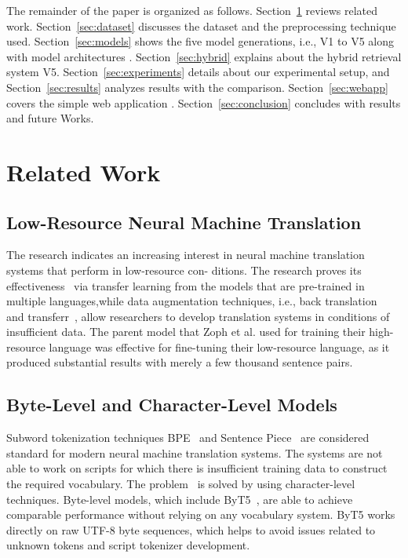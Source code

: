 \documentclass[conference]{IEEEtran}
\begin{document}
The remainder of the paper is organized as follows. Section~\ref{sec:related} reviews related work. Section~\ref{sec:dataset} discusses the dataset and the preprocessing technique used. Section~\ref{sec:models} shows the five model generations, i.e., V1 to V5 along with model architectures . Section~\ref{sec:hybrid} explains about the hybrid retrieval system V5. Section~\ref{sec:experiments} details about our experimental setup, and Section~\ref{sec:results} analyzes results with the comparison. Section~\ref{sec:webapp} covers the simple web application . Section~\ref{sec:conclusion} concludes with results and future Works.

\section{Related Work}\label{sec:related}

\subsection{Low-Resource Neural Machine Translation}

The research indicates an increasing interest in neural
machine translation systems that perform in low-resource con-
ditions. The research proves its effectiveness~\cite{liu2020mbart, xue2021mt5} via transfer learning from the models that are pre-trained in multiple languages,while data augmentation techniques, i.e., back translation~\cite{sennrich2016backtranslation} and
transferr~\cite{neubig2018rapid}, allow researchers to develop translation systems in conditions of insufficient data. The parent model that Zoph et
al. used for training their high-resource language was effective
for fine-tuning their low-resource language, as it produced
substantial results with merely a few thousand sentence pairs.

\subsection{Byte-Level and Character-Level Models}
Subword tokenization techniques BPE~\cite{sennrich2016bpe} and Sentence Piece~\cite{kudo2018sentencepiece}  are considered standard for modern neural machine translation systems. The systems are not able to work on scripts for which there is insufficient training data to construct the required vocabulary. The problem~\cite{lee2017fully} is solved by using character-level techniques. Byte-level models, which include ByT5~\cite{xue2022byt5}, are able to achieve comparable performance without relying on any vocabulary system. ByT5 works directly on raw UTF-8 byte sequences, which helps to avoid issues related to unknown tokens and script tokenizer development.
\end{document}
